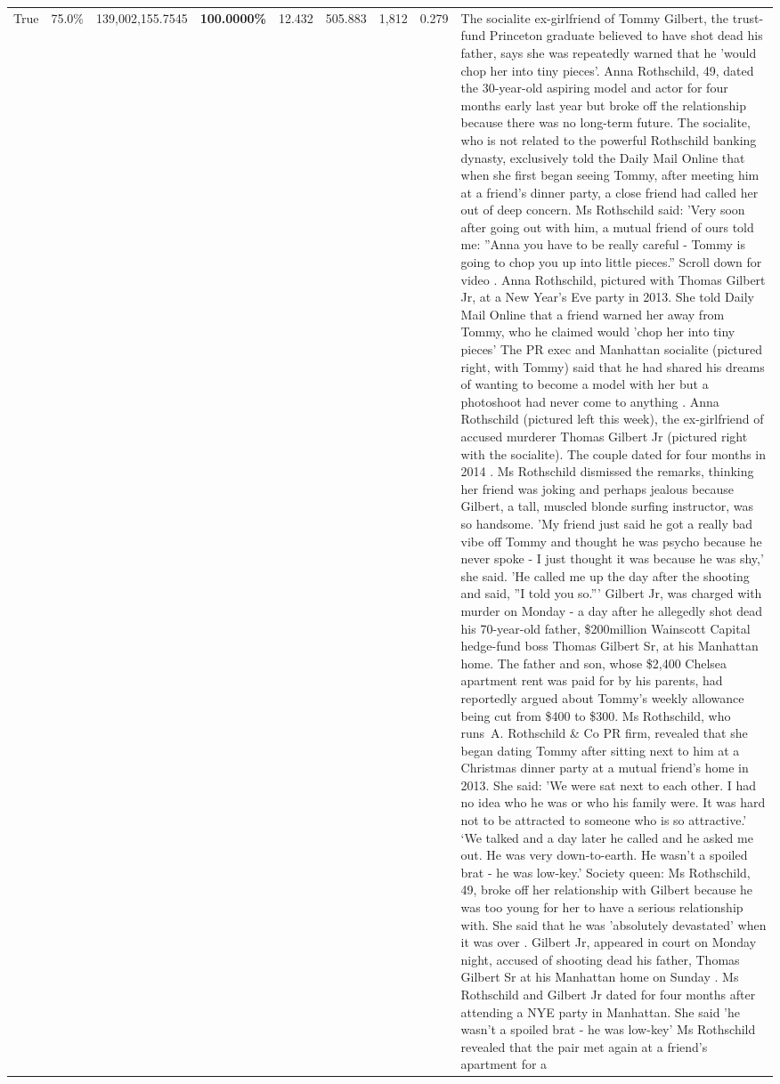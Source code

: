 \begin{table}[H]
\begin{tabular}{lllrlllll}
True & 75.0\% & 139,002,155.7545 & \bfseries \color{red} 100.0000\% & 12.432 & 505.883 & 1,812 & 0.279 & The socialite ex-girlfriend of Tommy Gilbert, the trust-fund Princeton graduate believed to have shot dead his father, says she was repeatedly warned that he 'would chop her into tiny pieces'. Anna Rothschild, 49, dated the 30-year-old aspiring model and actor for four months early last year but broke off the relationship because there was no long-term future. The socialite, who is not related to the powerful Rothschild banking dynasty, exclusively told the Daily Mail Online that when she first began seeing Tommy, after meeting him at a friend's dinner party, a close friend had called her out of deep concern. Ms Rothschild said: 'Very soon after going out with him, a mutual friend of ours told me: ''Anna you have to be really careful - Tommy is going to chop you up into little pieces.'' Scroll down for video . Anna Rothschild, pictured with Thomas Gilbert Jr, at a New Year's Eve party in 2013. She told Daily Mail Online that a friend warned her away from Tommy, who he claimed would 'chop her into tiny pieces' The PR exec and Manhattan socialite (pictured right, with Tommy) said that he had shared his dreams of wanting to become a model with her but a photoshoot had never come to anything . Anna Rothschild (pictured left this week), the ex-girlfriend of accused murderer Thomas Gilbert Jr (pictured right with the socialite). The couple dated for four months in 2014 . Ms Rothschild dismissed the remarks, thinking her friend was joking and perhaps jealous because Gilbert, a tall, muscled blonde surfing instructor, was so handsome. 'My friend just said he got a really bad vibe off Tommy and thought he was psycho because he never spoke - I just thought it was because he was shy,' she said. 'He called me up the day after the shooting and said, ''I told you so.''' Gilbert Jr, was charged with murder on Monday - a day after he allegedly shot dead his 70-year-old father, \$200million Wainscott Capital hedge-fund boss Thomas Gilbert Sr, at his Manhattan home. The father and son, whose \$2,400 Chelsea apartment rent was paid for by his parents, had reportedly argued about Tommy's weekly allowance being cut from \$400 to \$300. Ms Rothschild, who runs A. Rothschild \& Co PR firm, revealed that she began dating Tommy after sitting next to him at a Christmas dinner party at a mutual friend's home in 2013. She said: 'We were sat next to each other. I had no idea who he was or who his family were. It was hard not to be attracted to someone who is so attractive.' ‘We talked and a day later he called and he asked me out. He was very down-to-earth. He wasn’t a spoiled brat - he was low-key.’ Society queen: Ms Rothschild, 49, broke off her relationship with Gilbert because he was too young for her to have a serious relationship with. She said that he was 'absolutely devastated' when it was over . Gilbert Jr, appeared in court on Monday night, accused of shooting dead his father, Thomas Gilbert Sr at his Manhattan home on Sunday . Ms Rothschild and Gilbert Jr dated for four months after attending a NYE party in Manhattan. She said 'he wasn't a spoiled brat - he was low-key' Ms Rothschild revealed that the pair met again at a friend’s apartment for a 
\end{tabular}
\end{table}
